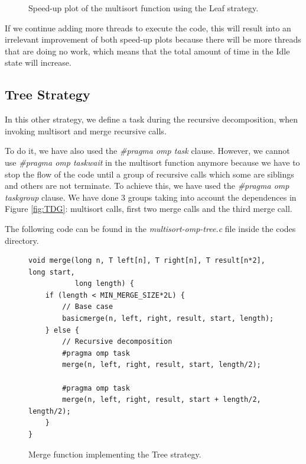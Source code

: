 \documentclass[12pt, a4paper]{article}
\begin{document}
\begin{figure}[H]
\begin{minipage}[b]{0.4\linewidth}
  \caption{Speed-up plot of the multisort function using the Leaf strategy.}
  \label{fig:mandel-omp-10000-strong-21-speedup}
\end{minipage}
\end{figure}

If we continue adding more threads to execute the code, this will result into an irrelevant improvement of both speed-up plots because there will be more threads that are doing no work, which means that the total amount of time in the Idle state will increase.

\subsection{Tree Strategy}
\label{treestrategy}

In this other strategy, we define a task during the recursive decomposition, when invoking multisort and merge recursive calls.

To do it, we have also used the \textit{\#pragma omp task} clause. However, we cannot use \textit{\#pragma omp taskwait} in the multisort function anymore because we have to stop the flow of the code until a group of recursive calls which some are siblings and others are not terminate. To achieve this, we have used the \textit{\#pragma omp taskgroup} clause. We have done 3 groups taking into account the dependences in Figure \ref{fig:TDG}: multisort calls, first two merge calls and the third merge call.

The following code can be found in the \textit{multisort-omp-tree.c} file inside the codes directory.

\begin{figure}[H]
\begin{lstlisting}
void merge(long n, T left[n], T right[n], T result[n*2], long start,
	 	   long length) {
    if (length < MIN_MERGE_SIZE*2L) {
        // Base case
        basicmerge(n, left, right, result, start, length);
    } else {
        // Recursive decomposition
        #pragma omp task
        merge(n, left, right, result, start, length/2);
        
        #pragma omp task
        merge(n, left, right, result, start + length/2, length/2);
    }
}
\end{lstlisting}

\caption{Merge function implementing the Tree strategy.}
\end{figure}
\end{document}
